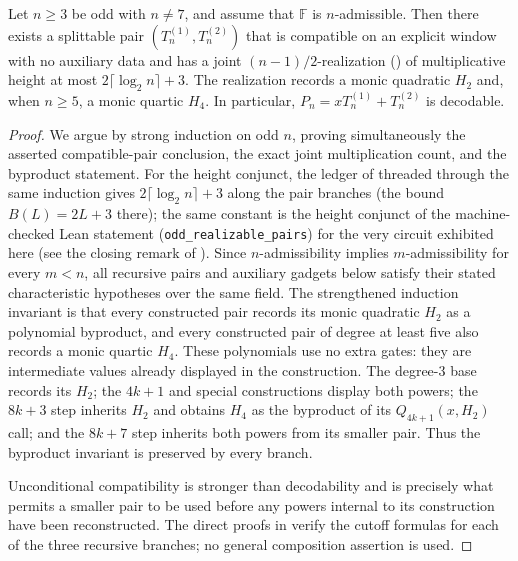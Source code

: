 \begin{theorem}
\label{thm:odd-realizable-pairs}
    Let $n\ge3$ be odd with $n\ne7$, and assume that $\mathbb F$ is
    $n$-admissible.  Then there exists a splittable pair
    $(T^{(1)}_n,T^{(2)}_n)$ that is compatible on an explicit window with no
    auxiliary data and has a joint $(n-1)/2$-realization
    () of multiplicative height at most
    $2\lceil\log_2n\rceil+3$.  The realization
    records a monic quadratic $H_2$ and, when $n\ge5$, a monic quartic $H_4$.
    In particular, $P_n=xT^{(1)}_n+T^{(2)}_n$ is decodable.
\end{theorem}
\begin{proof}
    We argue by strong induction on odd $n$, proving simultaneously the
    asserted compatible-pair conclusion, the exact joint multiplication
    count, and the byproduct statement.  For the height conjunct, the ledger
    of  threaded through the same
    induction gives $2\lceil\log_2n\rceil+3$ along the pair branches (the
    bound $B(L)=2L+3$ there); the same constant is the height conjunct of
    the machine-checked Lean statement (\texttt{odd\_realizable\_pairs}) for
    the very circuit exhibited here (see the closing remark of
    ).
    Since $n$-admissibility implies $m$-admissibility for every $m<n$, all
    recursive pairs and auxiliary gadgets below satisfy their stated
    characteristic hypotheses over the same field.
    The strengthened induction invariant is that every constructed pair records
    its monic quadratic $H_2$ as a polynomial byproduct, and every constructed
    pair of degree at least five also records a monic quartic $H_4$.  These
    polynomials use no extra gates: they are intermediate values already
    displayed in the construction.  The degree-$3$ base records its $H_2$;
    the $4k+1$ and special constructions display both powers; the $8k+3$ step
    inherits $H_2$ and obtains $H_4$ as the byproduct of its
    $Q_{4k+1}(x,H_2)$ call; and the $8k+7$ step inherits both powers from its
    smaller pair.  Thus the byproduct invariant is preserved by every branch.

    Unconditional compatibility is stronger than decodability and is precisely what permits a
    smaller pair to be used before any powers internal to its construction have
    been reconstructed.  The direct proofs in
    verify the cutoff formulas for each of the three recursive branches; no
    general composition assertion is used.


\end{proof}
